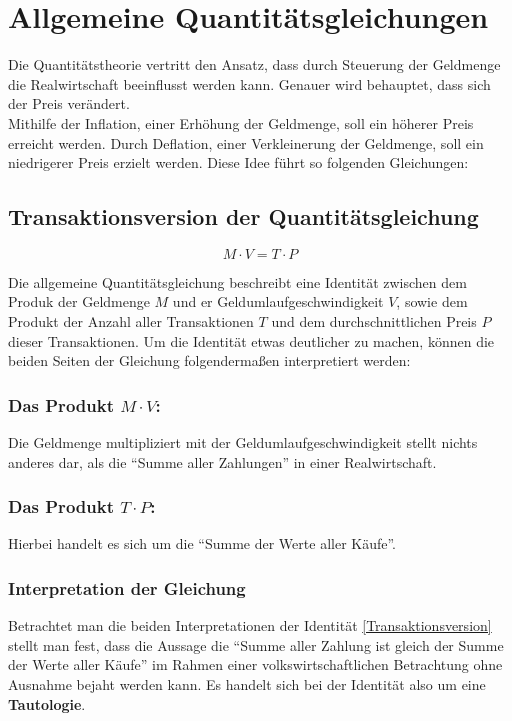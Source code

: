 \section{Allgemeine Quantitätsgleichungen}

Die Quantitätstheorie vertritt den Ansatz, dass durch Steuerung der Geldmenge die Realwirtschaft beeinflusst werden kann. Genauer wird behauptet, dass sich der Preis verändert. \\
Mithilfe der Inflation, einer Erhöhung der Geldmenge, soll ein höherer Preis erreicht werden. Durch Deflation, einer Verkleinerung der Geldmenge, soll ein niedrigerer Preis erzielt werden. Diese Idee führt so folgenden Gleichungen:
\subsection{Transaktionsversion der Quantitätsgleichung}
\begin{equation}
    \tag{Transaktionsversion}
    M \cdot V = T \cdot P
\end{equation}\label{Transaktionsversion}

Die allgemeine Quantitätsgleichung beschreibt eine Identität zwischen dem Produk der Geldmenge $M$ und er Geldumlaufgeschwindigkeit $V$, sowie dem Produkt der Anzahl aller Transaktionen $T$ und dem durchschnittlichen Preis $P$ dieser Transaktionen. Um die Identität etwas deutlicher zu machen, können die beiden Seiten der Gleichung folgendermaßen interpretiert werden:

\subsubsection*{Das Produkt $M \cdot V$:}
Die Geldmenge multipliziert mit der Geldumlaufgeschwindigkeit stellt nichts anderes dar, als die \enquote{Summe aller Zahlungen} in einer Realwirtschaft.

\subsubsection*{Das Produkt $T \cdot P$:}
Hierbei handelt es sich um die \enquote{Summe der Werte aller Käufe}.

\subsubsection*{Interpretation der Gleichung}
Betrachtet man die beiden Interpretationen der Identität \vref{Transaktionsversion} stellt man fest, dass die Aussage die \enquote{Summe aller Zahlung ist gleich der Summe der Werte aller Käufe} im Rahmen einer volkswirtschaftlichen Betrachtung ohne Ausnahme bejaht werden kann. Es handelt sich bei der Identität also um eine \textbf{Tautologie}.

